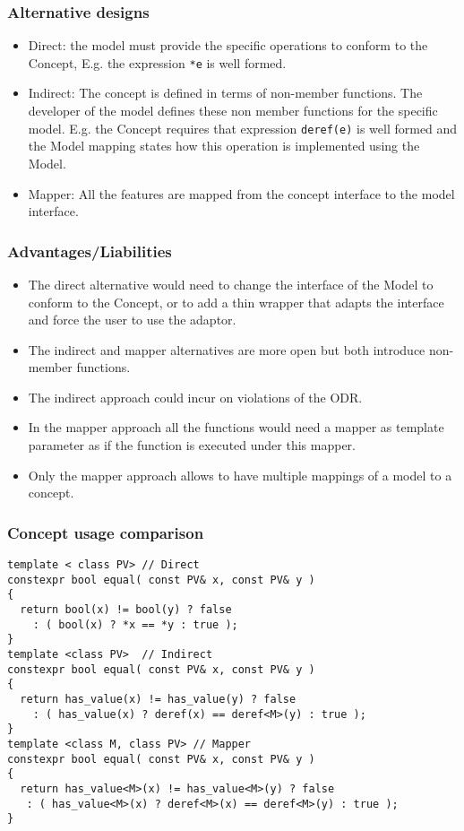\documentclass[xcolor=dvipsnames]{beamer}
\newcommand{\cpp}[1]{\lstinline{#1}}
\begin{document}
\begin{frame}[fragile]
\frametitle{Alternative designs}

\begin{itemize}
  \item Direct: the model must provide the specific operations to conform to the Concept, E.g. the expression \cpp{*e} is well formed.
  \item Indirect: The concept is defined in terms of non-member functions. The developer of the model defines these non member functions for the specific model. E.g. the Concept requires that expression \cpp{deref(e)} is well formed and the Model mapping states how this operation is implemented using the Model.
  \item Mapper: All the features are mapped from the concept interface to the model interface. 
\end{itemize}
\end{frame}
\begin{frame}[fragile]
\frametitle{Advantages/Liabilities}

\begin{itemize}
  \item The direct alternative would need to change the interface of the Model to conform to the Concept, or to add a thin wrapper that adapts the interface and force the user to use the adaptor.
  \item The indirect and mapper alternatives are more open but both introduce non-member functions. 
  \item The indirect approach could incur on violations of the ODR.  
  \item In the mapper approach all the functions would need a mapper as template parameter as if the function is executed under this mapper.
  \item Only the mapper approach allows to have multiple mappings of a model to a concept.  
  
\end{itemize}

\end{frame}
\begin{frame}[fragile]
\frametitle{Concept usage comparison}

\begin{lstlisting}
template < class PV> // Direct
constexpr bool equal( const PV& x, const PV& y ) 
{
  return bool(x) != bool(y) ? false 
    : ( bool(x) ? *x == *y : true );
}
template <class PV>  // Indirect
constexpr bool equal( const PV& x, const PV& y ) 
{
  return has_value(x) != has_value(y) ? false 
    : ( has_value(x) ? deref(x) == deref<M>(y) : true );
}
template <class M, class PV> // Mapper
constexpr bool equal( const PV& x, const PV& y ) 
{
  return has_value<M>(x) != has_value<M>(y) ? false 
   : ( has_value<M>(x) ? deref<M>(x) == deref<M>(y) : true );
}
\end{lstlisting}

\end{frame}
\end{document}
